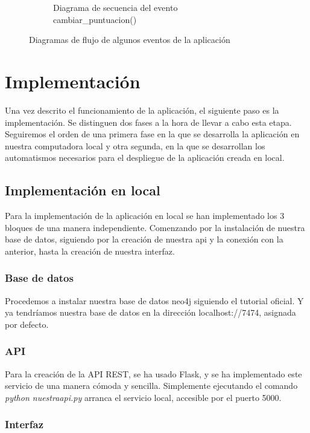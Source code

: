 \begin{figure}[hbtp]
\begin{subfigure}{.6\textwidth}
    \caption{Diagrama de secuencia del evento cambiar\_puntuacion()} 
    \label{fig::cambiarpuntuacion}
\end{subfigure}
\caption{Diagramas de flujo de algunos eventos de la aplicación }
\label{fig::secuencia}
\end{figure}


\section{Implementación}

Una vez descrito el funcionamiento de la aplicación, el siguiente paso es la implementación. Se distinguen dos fases a la hora de llevar a cabo esta etapa. Seguiremos el orden de una primera fase en la que se desarrolla la aplicación en nuestra computadora local y otra segunda, en la que se desarrollan los automatismos necesarios para el despliegue de la aplicación creada en local.

\subsection{Implementación en local}

Para la implementación de la aplicación en local se han implementado los 3 bloques de una manera independiente. Comenzando por la instalación de nuestra base de datos, siguiendo por la creación de nuestra api y la conexión con la anterior, hasta la creación de nuestra interfaz.

\subsubsection{Base de datos}

Procedemos a instalar nuestra base de datos neo4j siguiendo el tutorial oficial. Y ya tendríamos nuestra base de datos en la dirección localhost://7474, asignada por defecto\cite{neo4jinstall}.

\subsubsection{API}

Para la creación de la API REST, se ha usado Flask, y se ha implementado este servicio de una manera cómoda y sencilla. Simplemente ejecutando el comando \textit{python nuestraapi.py} arranca el servicio local, accesible por el puerto 5000\cite{flaskinstall}.

\subsubsection{Interfaz}

